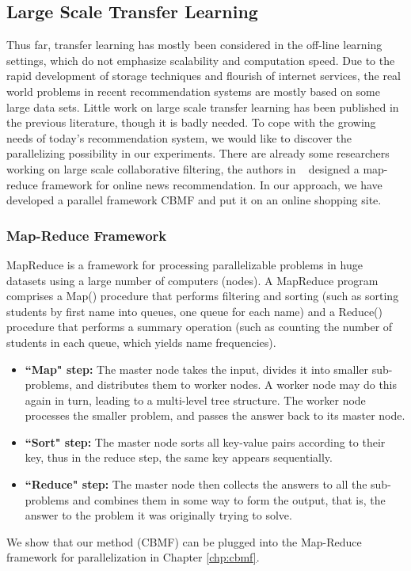 \subsection{Large Scale Transfer Learning}
Thus far, transfer learning has mostly been considered in the off-line learning settings, which do not emphasize scalability and computation speed. Due to the rapid development of storage techniques and flourish of internet services, the real world problems in recent recommendation systems are mostly based on some large data sets. Little work on large scale transfer learning has been published in the previous literature, though it is badly needed. To cope with the growing needs of today’s recommendation system, we would like to discover the parallelizing possibility in our experiments. There are already some researchers working on large scale collaborative filtering, the authors in ~\cite{das2007google} designed a map-reduce framework for online news recommendation. In our approach, we have developed a parallel framework CBMF and put it on an online shopping site.
\hspace{0.02in}
\subsubsection{Map-Reduce Framework}
MapReduce is a framework for processing parallelizable problems in huge datasets using a large number of computers (nodes). A MapReduce program comprises a Map() procedure that performs filtering and sorting (such as sorting students by first name into queues, one queue for each name) and a Reduce() procedure that performs a summary operation (such as counting the number of students in each queue, which yields name frequencies).
\begin{itemize}
\item {\bf ``Map" step:} The master node takes the input, divides it into smaller sub-problems, and distributes them to worker nodes. A worker node may do this again in turn, leading to a multi-level tree structure. The worker node processes the smaller problem, and passes the answer back to its master node.
\item {\bf ``Sort" step:} The master node sorts all key-value pairs according to their key, thus in the reduce step, the same key appears sequentially.
\item {\bf ``Reduce" step:} The master node then collects the answers to all the sub-problems and combines them in some way to form the output, that is, the answer to the problem it was originally trying to solve.
\end{itemize}
We show that our method (CBMF) can be plugged into the Map-Reduce framework for parallelization in Chapter \ref{chp:cbmf}.




